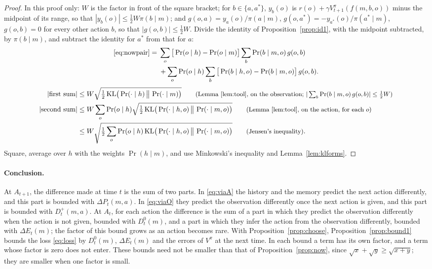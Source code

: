 \documentclass{article}
\theoremstyle{definition}
\numberwithin{equation}{section}
\newcommand{\KL}{\mathrm{KL}}
\newcommand{\dE}{\Delta E}
\newcommand{\dP}{\Delta P}
\newcommand{\why}[1]{\tag*{\small(#1)}}
\begin{document}
\begin{proof}
In this proof only: $W$ is the factor in front of the square bracket; for $b\in\{a,a^*\}$, $y_b(o)$ is $r(o)+\gamma V^\pi_{t+1}(f(m,b,o))$ minus the midpoint of its range, so that $|y_b(o)|\le\tfrac12W\pi(b\mid m)$; and $g(o,a)=y_a(o)/\pi(a\mid m)$, $g(o,a^*)=-y_{a^*}(o)/\pi(a^*\mid m)$, $g(o,b)=0$ for every other action $b$, so that $|g(o,b)|\le\tfrac12W$. Divide the identity of Proposition~\ref{prop:id1}, with the midpoint subtracted, by $\pi(b\mid m)$, and subtract the identity for $a^*$ from that for $a$:
\begin{align*}
\eqref{eq:nowpair}={}&\sum_o\big[\Pr(o\mid h)-\Pr(o\mid m)\big]\sum_b\Pr(b\mid m,o)\,g(o,b)\\
&+\sum_o\Pr(o\mid h)\sum_b\big[\Pr(b\mid h,o)-\Pr(b\mid m,o)\big]\,g(o,b).
\end{align*}
\begin{align*}
|\text{first sum}|&\le W\sqrt{\tfrac12\,\KL\big(\Pr(\cdot\mid h)\,\big\|\,\Pr(\cdot\mid m)\big)} \why{Lemma~\ref{lem:tool}, on the observation; $|\sum_b\Pr(b\mid m,o)\,g(o,b)|\le\tfrac12W$}\\
|\text{second sum}|&\le W\sum_o\Pr(o\mid h)\sqrt{\tfrac12\,\KL\big(\Pr(\cdot\mid h,o)\,\big\|\,\Pr(\cdot\mid m,o)\big)} \why{Lemma~\ref{lem:tool}, on the action, for each $o$}\\
&\le W\sqrt{\tfrac12\sum_o\Pr(o\mid h)\,\KL\big(\Pr(\cdot\mid h,o)\,\big\|\,\Pr(\cdot\mid m,o)\big)} \why{Jensen's inequality}.
\end{align*}
Square, average over $h$ with the weights $\Pr(h\mid m)$, and use Minkowski's inequality and Lemma~\ref{lem:klforms}.
\end{proof}

\paragraph{Conclusion.} At $A_{t+1}$, the difference made at time $t$ is the sum of two parts. In \eqref{eq:viaA} the history and the memory predict the next action differently, and this part is bounded with $\dP_t(m,a)$. In \eqref{eq:viaO} they predict the observation differently once the next action is given, and this part is bounded with $D^+_t(m,a)$. At $A_t$, for each action the difference is the sum of a part in which they predict the observation differently when the action is not given, bounded with $D^0_t(m)$, and a part in which they infer the action from the observation differently, bounded with $\dE_t(m)$; the factor of this bound grows as an action becomes rare. With Proposition~\ref{prop:choose}, Proposition~\ref{prop:bound1} bounds the loss \eqref{eq:loss} by $D^0_t(m)$, $\dE_t(m)$ and the errors of $V^\pi$ at the next time. In each bound a term has its own factor, and a term whose factor is zero does not enter. These bounds need not be smaller than that of Proposition~\ref{prop:now}, since $\sqrt x+\sqrt y\ge\sqrt{x+y}$; they are smaller when one factor is small.
\end{document}
